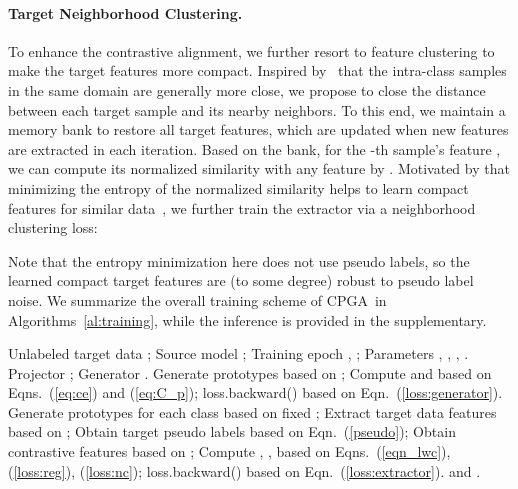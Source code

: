 \documentclass{article}
\def\ournet{CPGA}
\begin{document}
\paragraph{Target Neighborhood Clustering.} 
To enhance the contrastive alignment, we further resort to feature clustering to make the target features more compact. Inspired by~\cite{Saito2020UniversalDA} that the intra-class samples in the same domain are generally more close, we propose to close the distance between each target sample and its nearby neighbors.  
To this end, we maintain a memory bank  to restore all target features, which are updated when new features are extracted  in each iteration. 
Based on the bank, for the -th sample's feature , we can compute its normalized similarity with any feature  by 
.
Motivated by that minimizing the entropy of the normalized similarity helps to learn compact features for similar data~\cite{Saito2020UniversalDA},  we further train the extractor via a neighborhood clustering loss:

Note that the entropy minimization here does not use pseudo labels, so the learned compact target features are (to some degree) robust to pseudo label noise. We summarize the overall training scheme of \ournet~in Algorithms~\ref{al:training}, while the inference is provided in the supplementary.

\begin{algorithm}[t]
    \small
    \caption{Training of \ournet}\label{al:training}
    \begin{algorithmic}[1]
        \REQUIRE Unlabeled target data ; Source model ; Training epoch , ; Parameters , , , .
    \ENSURE Projector ; Generator . 
    \FOR{}
        \STATE Generate prototypes  based on ;
\STATE Compute  and  based on Eqns.~(\ref{eq:ce}) and (\ref{eq:C_p});
\STATE loss.backward()  based on Eqn.~(\ref{loss:generator}).
    \ENDFOR
    \FOR{}
        \STATE Generate prototypes  for each class based on fixed ;
        \STATE Extract target data features  based on ;
        \STATE Obtain target pseudo labels based on Eqn.~(\ref{pseudo});
        \STATE Obtain contrastive features  based on ; 
        \STATE Compute , ,  based on Eqns.~(\ref{eqn_lwc}), (\ref{loss:reg}), (\ref{loss:nc});
\STATE loss.backward()  based on Eqn.~(\ref{loss:extractor}).
    \ENDFOR
    \RETURN  and .
     \end{algorithmic}
\end{algorithm}
\end{document}
